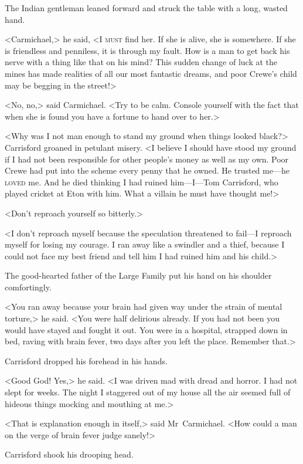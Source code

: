The Indian gentleman leaned forward and struck the table with a long, wasted hand.

<Carmichael,> he said, <I \textsc{must} find her. If she is alive, she is somewhere. If she is friendless and penniless, it is through my fault. How is a man to get back his nerve with a thing like that on his mind? This sudden change of luck at the mines has made realities of all our most fantastic dreams, and poor Crewe's child may be begging in the street!>

<No, no,> said Carmichael. <Try to be calm. Console yourself with the fact that when she is found you have a fortune to hand over to her.>

<Why was I not man enough to stand my ground when things looked black?> Carrisford groaned in petulant misery. <I believe I should have stood my ground if I had not been responsible for other people's money as well as my own. Poor Crewe had put into the scheme every penny that he owned. He trusted me—he \textsc{loved} me. And he died thinking I had ruined him—I—Tom Carrisford, who played cricket at Eton with him. What a villain he must have thought me!>

<Don't reproach yourself so bitterly.>

<I don't reproach myself because the speculation threatened to fail—I reproach myself for losing my courage. I ran away like a swindler and a thief, because I could not face my best friend and tell him I had ruined him and his child.>

The good-hearted father of the Large Family put his hand on his shoulder comfortingly.

<You ran away because your brain had given way under the strain of mental torture,> he said. <You were half delirious already. If you had not been you would have stayed and fought it out. You were in a hospital, strapped down in bed, raving with brain fever, two days after you left the place. Remember that.>

Carrisford dropped his forehead in his hands.

<Good God! Yes,> he said. <I was driven mad with dread and horror. I had not slept for weeks. The night I staggered out of my house all the air seemed full of hideous things mocking and mouthing at me.>

<That is explanation enough in itself,> said Mr~Carmichael. <How could a man on the verge of brain fever judge sanely!>

Carrisford shook his drooping head.

